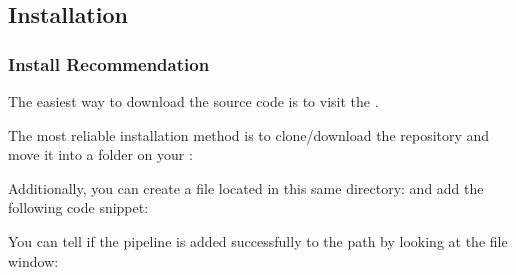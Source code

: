 \documentclass[letterpaper,10pt,english]{sphinxmanual}
\begin{document}
\sphinxstepscope


\subsection{Installation}
\label{\detokenize{get_started/install:installation}}\label{\detokenize{get_started/install::doc}}

\subsubsection{Install Recommendation}
\label{\detokenize{get_started/install:install-recommendation}}
\sphinxAtStartPar
The easiest way to download the source code is to visit the .

\sphinxAtStartPar
The most reliable installation method is to clone/download the repository and move it into a folder on your :

\begin{sphinxVerbatim}[commandchars=\\\{\}]

\end{sphinxVerbatim}

\sphinxAtStartPar
Additionally, you can create a  file located in this same  directory:  and add the following code snippet:

\begin{sphinxVerbatim}[commandchars=\\\{\}]
\end{sphinxVerbatim}

\sphinxAtStartPar
You can tell if the pipeline is added successfully to the path by looking at the file window:
\end{document}
